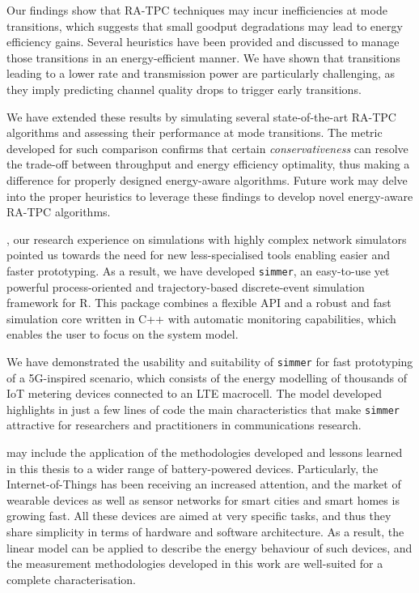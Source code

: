\documentclass[twoside,nohyper]{tufte-book}
\theoremstyle{definition}
\theoremstyle{definition}
\theoremstyle{definition}
\theoremstyle{remark}
\begin{document}
Our
findings\cite[0pt]{contrib-06}
show that RA-TPC techniques may incur inefficiencies at mode
transitions, which suggests that small goodput degradations may lead to
energy efficiency gains. Several heuristics have been provided and
discussed to manage those transitions in an energy-efficient manner. We
have shown that transitions leading to a lower rate and transmission
power are particularly challenging, as they imply predicting channel
quality drops to trigger early transitions.

We have
extended\cite[0pt]{contrib-07}
these results by simulating several state-of-the-art RA-TPC algorithms
and assessing their performance at mode transitions. The metric
developed for such comparison confirms that certain
\emph{conservativeness} can resolve the trade-off between throughput and
energy efficiency optimality, thus making a difference for properly
designed energy-aware algorithms. Future work may delve into the proper
heuristics to leverage these findings to develop novel energy-aware
RA-TPC algorithms.

, our research experience on simulations with highly
complex network simulators pointed us towards the need for new
less-specialised tools enabling easier and faster prototyping. As a
result, we have developed
\texttt{simmer}\cite[0pt]{contrib-08a},
an easy-to-use yet powerful process-oriented and trajectory-based
discrete-event simulation framework for R. This package combines a
flexible API and a robust and fast simulation core written in C++ with
automatic monitoring capabilities, which enables the user to focus on
the system model.

\pagebreak

We have
demonstrated\cite[0pt]{contrib-08b}
the usability and suitability of \texttt{simmer} for fast prototyping of
a 5G-inspired scenario, which consists of the energy modelling of
thousands of IoT metering devices connected to an LTE macrocell. The
model developed highlights in just a few lines of code the main
characteristics that make \texttt{simmer} attractive for researchers and
practitioners in communications research.

 may include the application of the
methodologies developed and lessons learned in this thesis to a wider
range of battery-powered devices. Particularly, the Internet-of-Things
has been receiving an increased attention, and the market of wearable
devices as well as sensor networks for smart cities and smart homes is
growing fast. All these devices are aimed at very specific tasks, and
thus they share simplicity in terms of hardware and software
architecture. As a result, the linear model can be applied to describe
the energy behaviour of such devices, and the measurement methodologies
developed in this work are well-suited for a complete characterisation.
\end{document}
